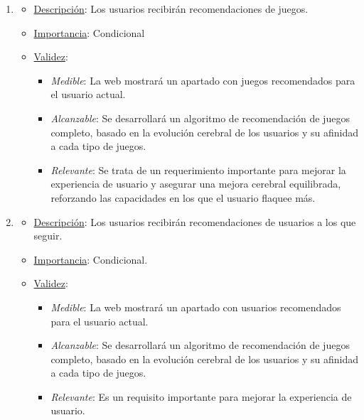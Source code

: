 \begin{enumerate}
\item %
  \begin{itemize}
  \item \underline{Descripción}: Los usuarios recibirán recomendaciones de juegos.
  \item \underline{Importancia}: Condicional
  \item \underline{Validez}:
    \begin{itemize}
    \item \textit{Medible}: La web mostrará un apartado con juegos recomendados para el usuario actual.
    \item \textit{Alcanzable}: Se desarrollará un algoritmo de recomendación de juegos completo, basado en la evolución cerebral de los usuarios y su afinidad a cada tipo de juegos.
    \item \textit{Relevante}: Se trata de un requerimiento importante para mejorar la experiencia de usuario y asegurar una mejora cerebral equilibrada, reforzando las capacidades en los que el usuario flaquee más.
    \end{itemize}
  \end{itemize}

\item %
  \begin{itemize}
  \item \underline{Descripción}: Los usuarios recibirán recomendaciones de usuarios a los que seguir.
  \item \underline{Importancia}: Condicional.
  \item \underline{Validez}:
    \begin{itemize}
    \item \textit{Medible}: La web mostrará un apartado con usuarios recomendados para el usuario actual.
    \item \textit{Alcanzable}: Se desarrollará un algoritmo de recomendación de juegos completo, basado en la evolución cerebral de los usuarios y su afinidad a cada tipo de juegos.
    \item \textit{Relevante}: Es un requisito importante para mejorar la experiencia de usuario.
    \end{itemize}
  \end{itemize}


\end{enumerate}
